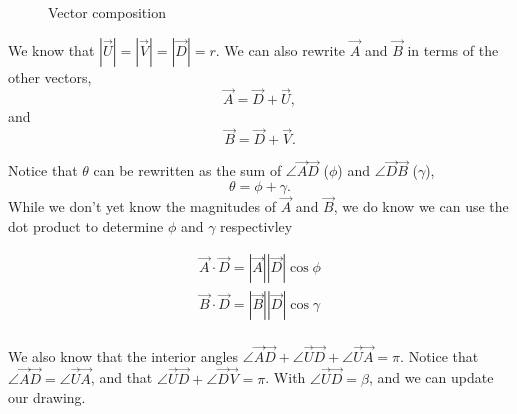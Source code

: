 \documentclass[main.tex]{subfiles}
\begin{document}
{\begin{figure}[h]
\begin{tikzpicture}
    \end{tikzpicture}
    \caption{Vector composition}
\end{figure}


We know that $|\vec{U}| = |\vec{V}| = |\vec{D}| = r$.
We can also rewrite $\vec{A}$ and $\vec{B}$ in terms of the other vectors,
\[\vec{A} = \vec{D} + \vec{U},\] and \[\vec{B} = \vec{D} + \vec{V}.\]

Notice that $\theta$ can be rewritten as the sum of 
$\angle{\vec{A}\vec{D}}$ ($\phi$) and $\angle{\vec{D}\vec{B}}$ ($\gamma$),
\[\theta = \phi + \gamma.\]
While we don't yet know the magnitudes of $\vec{A}$ and $\vec{B}$, we do 
know we can use the dot product to determine $\phi$ and $\gamma$ respectivley

\begin{align*}
\vec{A}\cdot\vec{D} = |\vec{A}||\vec{D}|\cos{\phi}\\
\vec{B}\cdot\vec{D} = |\vec{B}||\vec{D}|\cos{\gamma}\\
\end{align*}

We also know that the interior angles 
$\angle{\vec{A}\vec{D}} + \angle{\vec{U}\vec{D}} + \angle{\vec{U}\vec{A}} = \pi$.
Notice that $\angle{\vec{A}\vec{D}} = \angle{\vec{U}\vec{A}}$, and that 
$\angle{\vec{U}\vec{D}} + \angle{\vec{D}\vec{V}} = \pi$.
With $\angle{\vec{U}\vec{D}} = \beta$, and we can update our drawing.

\def \colphi {3!50!4!50!1}
\def \colgam {5!50!3!50!2}
\def \colbeta {4!50!3}
\def \colpibeta {4!50!5}

\begin{figure}[h]
    \centering
    
\end{figure}}
\end{document}
